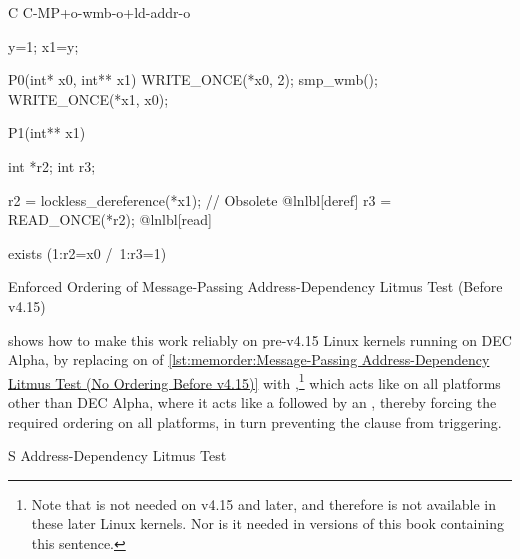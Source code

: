 \begin{listing}
\begin{fcvlabel}
\begin{VerbatimL}[commandchars=\@\[\]]
C C-MP+o-wmb-o+ld-addr-o

{
y=1;
x1=y;
}

P0(int* x0, int** x1) {
	WRITE_ONCE(*x0, 2);
	smp_wmb();
	WRITE_ONCE(*x1, x0);
}

P1(int** x1) {
	int *r2;
	int r3;

	r2 = lockless_dereference(*x1); // Obsolete @lnlbl[deref]
	r3 = READ_ONCE(*r2);			    @lnlbl[read]
}

exists (1:r2=x0 /\ 1:r3=1)
\end{VerbatimL}
\end{fcvlabel}
\caption{Enforced Ordering of Message-Passing Address-Dependency Litmus Test (Before v4.15)}
\label{lst:memorder:Enforced Ordering of Message-Passing Address-Dependency Litmus Test (Before v4.15)}
\end{listing}

\begin{fcvref}
shows how to make this work reliably on pre-v4.15 Linux kernels running on
DEC Alpha, by replacing  on  of
\cref{lst:memorder:Message-Passing Address-Dependency Litmus Test (No Ordering Before v4.15)}
with ,\footnote{
	Note that  is not needed on v4.15 and
	later, and therefore is not available in these later Linux kernels.
	Nor is it needed in versions of this book containing this sentence.}
which acts like  on all platforms other than DEC Alpha,
where it acts like a  followed by an ,
thereby forcing the required ordering on all platforms, in turn
preventing the  clause from triggering.
\end{fcvref}

\begin{listing}

\caption{S Address-Dependency Litmus Test}
\label{lst:memorder:S Address-Dependency Litmus Test}
\end{listing}

